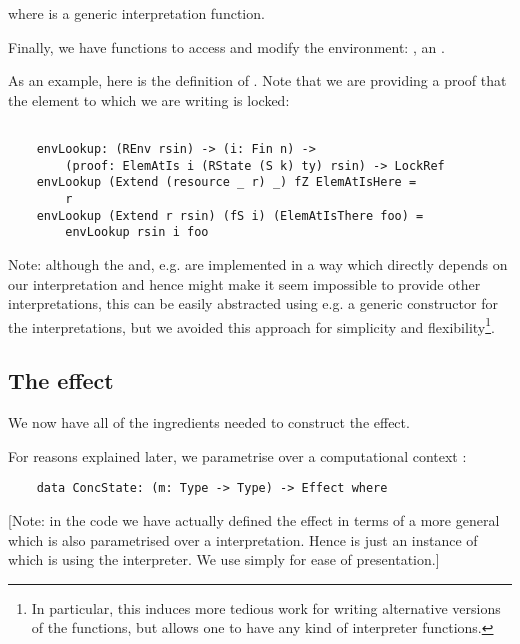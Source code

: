 where  is a generic interpretation function.

Finally, we have functions to access and modify the environment:
,  an .

As an example, here is the definition of . Note that we are
providing a proof that the element to which we are writing is locked:

\begin{BVerbatim}

    envLookup: (REnv rsin) -> (i: Fin n) ->
        (proof: ElemAtIs i (RState (S k) ty) rsin) -> LockRef
    envLookup (Extend (resource _ r) _) fZ ElemAtIsHere =
        r
    envLookup (Extend r rsin) (fS i) (ElemAtIsThere foo) =
        envLookup rsin i foo

\end{BVerbatim}

Note: although the  and, e.g.  are implemented in a
way which directly depends on our  interpretation and hence
might make it seem impossible to provide other interpretations, this can be
easily abstracted using e.g. a generic constructor for the interpretations,
but we avoided this approach for simplicity and flexibility\footnote{
    In particular, this induces more tedious work for writing alternative versions
    of the  functions, but allows one to have any kind of interpreter
    functions.}.

\subsection{The effect}

We now have all of the ingredients needed to construct the
 effect.

For reasons explained later, we parametrise  over a
computational context :

\begin{BVerbatim}
    data ConcState: (m: Type -> Type) -> Effect where
\end{BVerbatim}

[Note: in the code we have actually defined the effect in terms of a more
general  which is also parametrised over a 
interpretation. Hence  is just an instance of
 which is using the  interpreter. We use
 simply for ease of presentation.]

